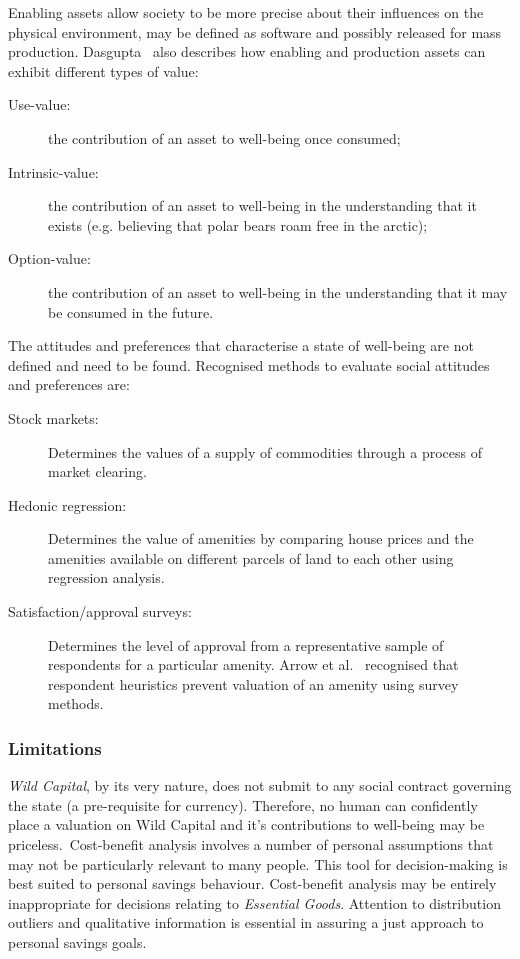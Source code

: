 \documentclass[11pt, oneside]{article}   	%
\begin{document}
Enabling assets allow society to be more precise about their influences on the physical environment, may be defined as software and possibly released for mass production. Dasgupta~\cite{pd2} also describes how enabling and production assets can exhibit different types of value:

\begin{description}
\item[Use-value:] the contribution of an asset to well-being once consumed;
\item[Intrinsic-value:] the contribution of an asset to well-being in the understanding that it exists (e.g. believing that polar bears roam free in the arctic);
\item[Option-value:] the contribution of an asset to well-being in the understanding that it may be consumed in the future.
\end{description}

The attitudes and preferences that characterise a state of well-being are not defined and need to be found. Recognised methods to evaluate social attitudes and preferences are:

\begin{description}
\item[Stock markets:] Determines the values of a supply of commodities through a process of market clearing.
\item[Hedonic regression:] Determines the value of amenities by comparing house prices and the amenities available on different parcels of land to each other using regression analysis.
\item[Satisfaction/approval surveys:] Determines the level of approval from a representative sample of respondents for a particular amenity. Arrow et al.~\cite{kja1} recognised that respondent heuristics prevent valuation of an amenity using survey methods.
\end{description}

\subsubsection{Limitations}

\emph{Wild Capital}, by its very nature, does not submit to any social contract governing the state (a pre-requisite for currency).
Therefore, no human can confidently place a valuation on Wild Capital and it's contributions to well-being may be priceless.\
Cost-benefit analysis involves a number of personal assumptions that may not be particularly relevant to many people. This tool for decision-making is best suited to personal savings behaviour.
Cost-benefit analysis may be entirely inappropriate for decisions relating to \emph{Essential Goods}.
Attention to distribution outliers and qualitative information is essential in assuring a just approach to personal savings goals.
\end{document}
